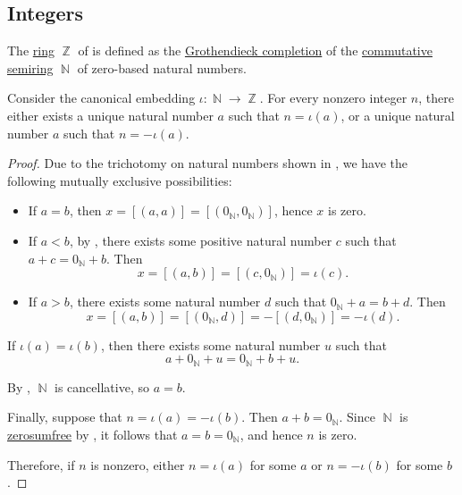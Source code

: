 \subsection{Integers}\label{subsec:integers}

\begin{definition}\label{def:integers}
  The \hyperref[def:ring]{ring} \( \BbbZ \) of  is defined as the \hyperref[thm:grothendieck_semiring_completion]{Grothendieck completion} of the \hyperref[def:semiring/commutative]{commutative semiring} \( \BbbN \) of zero-based natural numbers.
\end{definition}

\begin{lemma}\label{thm:integer_signum_lemma}
  Consider the canonical embedding \( \iota: \BbbN \to \BbbZ \). For every nonzero integer \( n \), there either exists a unique natural number \( a \) such that \( n = \iota(a) \), or a unique natural number \( a \) such that \( n = -\iota(a) \).
\end{lemma}
\begin{proof}
  \ExistenceSubProof Due to the trichotomy on natural numbers shown in , we have the following mutually exclusive possibilities:
  \begin{itemize}
    \item If \( a = b \), then \( x = [(a, a)] = [(0_\BbbN, 0_\BbbN)] \), hence \( x \) is zero.
    \item If \( a < b \), by , there exists some positive natural number \( c \) such that \( a + c = 0_\BbbN + b \). Then
    \begin{equation*}
      x = [(a, b)] = [(c, 0_\BbbN)] = \iota(c).
    \end{equation*}

    \item If \( a > b \), there exists some natural number \( d \) such that \( 0_\BbbN + a = b + d \). Then
    \begin{equation*}
      x = [(a, b)] = [(0_\BbbN, d)] = -[(d, 0_\BbbN)] = -\iota(d).
    \end{equation*}
  \end{itemize}

  \UniquenessSubProof If \( \iota(a) = \iota(b) \), then there exists some natural number \( u \) such that
  \begin{equation*}
     a + 0_\BbbN + u = 0_\BbbN + b + u.
  \end{equation*}

  By , \( \BbbN \) is cancellative, so \( a = b \).

   Finally, suppose that \( n = \iota(a) = -\iota(b) \). Then \( a + b = 0_\BbbN \). Since \( \BbbN \) is \hyperref[def:zerosumfree]{zerosumfree} by , it follows that \( a = b = 0_\BbbN \), and hence \( n \) is zero.

  Therefore, if \( n \) is nonzero, either \( n = \iota(a) \) for some \( a \) or \( n = -\iota(b) \) for some \( b \).
\end{proof}

